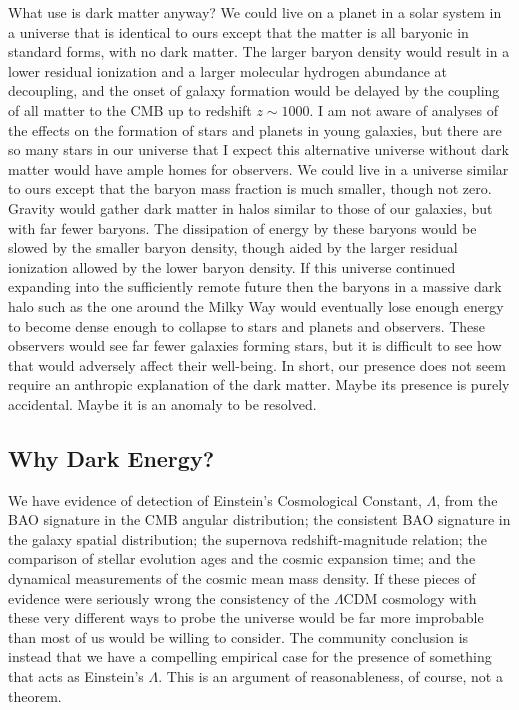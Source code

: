\documentclass[fleqn,12pt]{article}
\begin{document}
What use is dark matter anyway? We could live on a planet in a solar system in a universe that is identical to ours except that the matter is all baryonic in standard forms, with no dark matter. The larger baryon density would result in a lower residual ionization and a larger molecular hydrogen abundance at decoupling, and the onset of galaxy formation would be delayed by the coupling of all matter to the CMB up to redshift $z\sim 1000$. I am not aware of analyses of the effects on the formation of stars and planets in young galaxies, but there are so many stars in our universe that I expect this alternative universe without dark matter would have ample homes for observers. We could live in a universe similar to ours except that the baryon mass fraction is much smaller, though not zero. Gravity would gather dark matter in halos similar to those of our galaxies, but with far fewer baryons. The dissipation of energy by these baryons would be slowed by the smaller baryon density, though aided by the larger residual ionization allowed by the lower baryon density. If this universe continued expanding into the sufficiently remote future then the baryons in a massive dark halo such as the one around the Milky Way would eventually lose enough energy to become dense enough to collapse to stars and planets and observers. These observers would see far fewer galaxies forming stars, but it is difficult to see how that would adversely affect their well-being. In short, our presence does not seem require an anthropic explanation of the dark matter. Maybe its presence  is purely accidental. Maybe it is an anomaly to be resolved.

\subsection{Why Dark Energy?}\label{sec:Lambda} 

We have evidence of detection of Einstein's Cosmological Constant, $\Lambda$, from the BAO signature in the CMB angular distribution; the consistent BAO signature in the galaxy spatial distribution; the supernova redshift-magnitude relation; the comparison of stellar evolution ages and the cosmic expansion time; and the dynamical measurements of the cosmic mean mass density. If these pieces of evidence were seriously wrong the consistency of the $\Lambda$CDM cosmology with these very different ways to probe the universe would be far more improbable than most of us would be willing to consider. The community  conclusion is instead that we have a compelling empirical case for the presence of something that acts as Einstein's $\Lambda$. This is an argument of reasonableness, of course, not a theorem.
\end{document}
